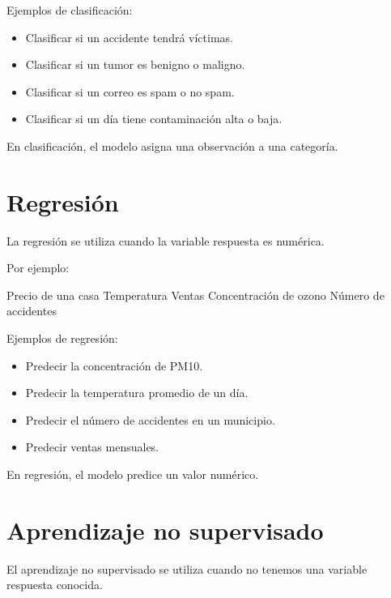 \documentclass[
  11pt,
  letterpaper,
]{book}
\newenvironment{Shaded}{\begin{snugshade}}{\end{snugshade}}
\newcommand{\NormalTok}[1]{\textcolor[rgb]{0.00,0.23,0.31}{#1}}
\providecommand{\tightlist}{%
  \setlength{\itemsep}{0pt}\setlength{\parskip}{0pt}}
\begin{document}
Ejemplos de clasificación:

\begin{itemize}
\tightlist
\item
  Clasificar si un accidente tendrá víctimas.
\item
  Clasificar si un tumor es benigno o maligno.
\item
  Clasificar si un correo es spam o no spam.
\item
  Clasificar si un día tiene contaminación alta o baja.
\end{itemize}

En clasificación, el modelo asigna una observación a una categoría.

\section{Regresión}\label{regresiuxf3n}

La regresión se utiliza cuando la variable respuesta es numérica.

Por ejemplo:

\begin{Shaded}
\begin{Highlighting}[]
\NormalTok{Precio de una casa}
\NormalTok{Temperatura}
\NormalTok{Ventas}
\NormalTok{Concentración de ozono}
\NormalTok{Número de accidentes}
\end{Highlighting}
\end{Shaded}

Ejemplos de regresión:

\begin{itemize}
\tightlist
\item
  Predecir la concentración de PM10.
\item
  Predecir la temperatura promedio de un día.
\item
  Predecir el número de accidentes en un municipio.
\item
  Predecir ventas mensuales.
\end{itemize}

En regresión, el modelo predice un valor numérico.

\section{Aprendizaje no supervisado}\label{aprendizaje-no-supervisado}

El aprendizaje no supervisado se utiliza cuando no tenemos una variable
respuesta conocida.
\end{document}
